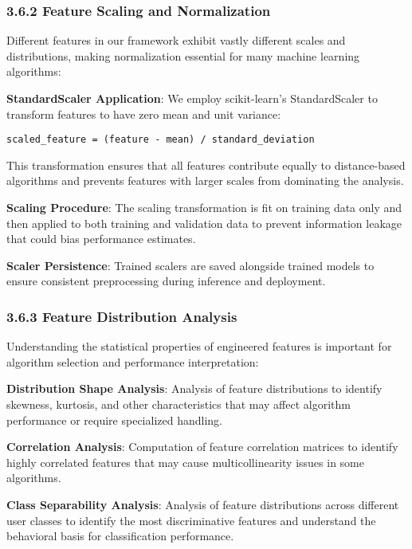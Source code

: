 \documentclass[
  11pt,
  a4paper,
]{article}
\begin{document}
\subsubsection{3.6.2 Feature Scaling and
Normalization}\label{feature-scaling-and-normalization}

Different features in our framework exhibit vastly different scales and
distributions, making normalization essential for many machine learning
algorithms:

\textbf{StandardScaler Application}: We employ scikit-learn's
StandardScaler to transform features to have zero mean and unit
variance:

\begin{verbatim}
scaled_feature = (feature - mean) / standard_deviation
\end{verbatim}

This transformation ensures that all features contribute equally to
distance-based algorithms and prevents features with larger scales from
dominating the analysis.

\textbf{Scaling Procedure}: The scaling transformation is fit on
training data only and then applied to both training and validation data
to prevent information leakage that could bias performance estimates.

\textbf{Scaler Persistence}: Trained scalers are saved alongside trained
models to ensure consistent preprocessing during inference and
deployment.

\subsubsection{3.6.3 Feature Distribution
Analysis}\label{feature-distribution-analysis}

Understanding the statistical properties of engineered features is
important for algorithm selection and performance interpretation:

\textbf{Distribution Shape Analysis}: Analysis of feature distributions
to identify skewness, kurtosis, and other characteristics that may
affect algorithm performance or require specialized handling.

\textbf{Correlation Analysis}: Computation of feature correlation
matrices to identify highly correlated features that may cause
multicollinearity issues in some algorithms.

\textbf{Class Separability Analysis}: Analysis of feature distributions
across different user classes to identify the most discriminative
features and understand the behavioral basis for classification
performance.
\end{document}
